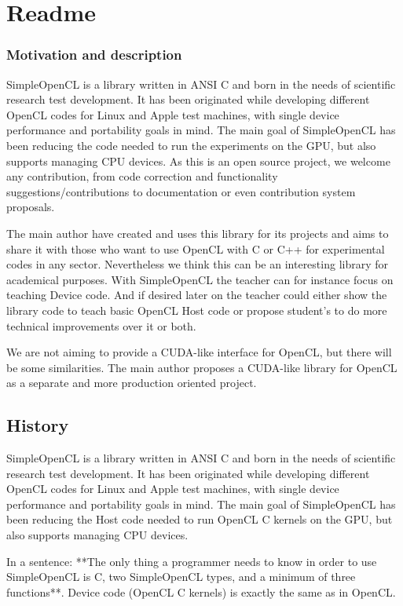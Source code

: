 \documentclass{report}
\begin{document}
\chapter{Readme}

\subsection{Motivation and description}

SimpleOpenCL is a library written in ANSI C and born in the needs of scientific research test development. It has been originated while developing different OpenCL codes for Linux and Apple test machines, with single device performance and portability goals in mind. The main goal of SimpleOpenCL has been reducing the code needed to run the experiments on the GPU, but also supports managing CPU devices. As this is an open source project, we welcome any contribution, from code correction and functionality suggestions/contributions to documentation or even contribution system proposals.

The main author have created and uses this library for its projects and aims to share it with those who want to use OpenCL with C or C++ for experimental codes in any sector. Nevertheless we think this can be an interesting library for academical purposes. With SimpleOpenCL the teacher can for instance focus on teaching Device code. And if desired later on the teacher could either show the library code to teach basic OpenCL Host code or propose student's to do more technical improvements over it or both.

We are not aiming to provide a CUDA-like interface for OpenCL, but there will be some similarities. The main author proposes a CUDA-like library for OpenCL as a separate and more production oriented project.  


\section{History}
SimpleOpenCL is a library written in ANSI C and born in the needs of scientific research test development. It has been originated while developing different OpenCL codes for Linux and Apple test machines, with single device performance and portability goals in mind. The main goal of SimpleOpenCL has been reducing the Host code needed to run OpenCL C kernels on the GPU, but also supports managing CPU devices. 

In a sentence: **The only thing a programmer needs to know in order to use SimpleOpenCL is C, two SimpleOpenCL types, and a minimum of three functions**. 
Device code (OpenCL C kernels) is exactly the same as in OpenCL.
\end{document}
